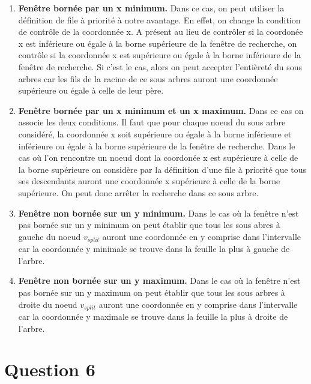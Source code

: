 \documentclass{article}
\begin{document}
    \begin{enumerate}
        \item \textbf{Fenêtre bornée par un x minimum.} Dans ce cas, on peut utiliser la définition de file à priorité à notre avantage. En effet, on change la condition de contrôle de la coordonnée x.
        A présent au lieu de contrôler si la coordonée x est inférieure ou égale à la borne supérieure de la fenêtre de recherche, on contrôle si la coordonnée x est supérieure ou égale à la borne inférieure de la fenêtre de recherche.
        Si c'est le cas, alors on peut accepter l'entièreté du sous arbres car les fils de la racine de ce sous arbres auront une coordonnée supérieure ou égale à celle de leur père.
        \item \textbf{Fenêtre bornée par un x minimum et un x maximum.} Dans ce cas on associe les deux conditions. Il faut que pour chaque noeud du sous arbre considéré, la coordonnée x soit supérieure ou égale à la borne inférieure et
        inférieure ou égale à la borne supérieure de la fenêtre de recherche. Dans le cas où l'on rencontre un noeud dont la coordonée x est supérieure à celle de la borne supérieure on considère par la définition
        d'une file à priorité que tous ses descendants auront une coordonnée x supérieure à celle de la borne supérieure. On peut donc arrêter la recherche dans ce sous arbre.
        \item \textbf{Fenêtre non bornée sur un y minimum.} Dans le cas où la fenêtre n'est pas bornée sur un y minimum on peut établir que tous les sous abres à gauche du noeud 
        $v_{split}$ auront une coordonnée en y comprise dans l'intervalle car la coordonnée y minimale se trouve dans la feuille la plus à gauche de l'arbre.
        \item \textbf{Fenêtre non bornée sur un y maximum.} Dans le cas où la fenêtre n'est pas bornée sur un y maximum on peut établir que tous les sous arbres à droite du noeud
        $v_{split}$ auront une coordonnée en y comprise dans l'intervalle car la coordonnée y maximale se trouve dans la feuille la plus à droite de l'arbre.
    \end{enumerate}
\newpage
\section{Question 6}
\end{document}
